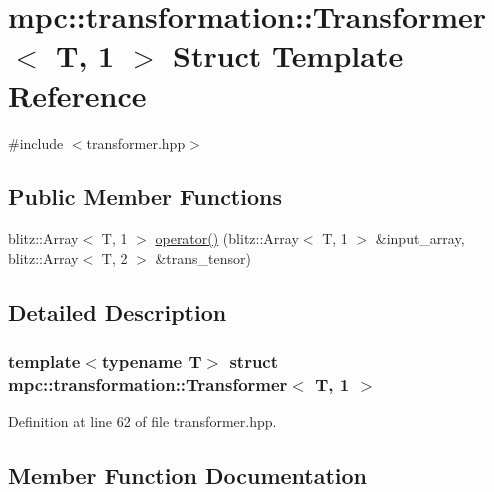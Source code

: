 \hypertarget{structmpc_1_1transformation_1_1_transformer_3_01_t_00_011_01_4}{}\section{mpc\+:\+:transformation\+:\+:Transformer$<$ T, 1 $>$ Struct Template Reference}
\label{structmpc_1_1transformation_1_1_transformer_3_01_t_00_011_01_4}


{\ttfamily \#include $<$transformer.\+hpp$>$}

\subsection*{Public Member Functions}
\begin{DoxyCompactItemize}
\item 
blitz\+::\+Array$<$ T, 1 $>$ \mbox{\hyperlink{structmpc_1_1transformation_1_1_transformer_3_01_t_00_011_01_4_aeb2bd7dbf3f77b736f7dc58cb39e0b41}{operator()}} (blitz\+::\+Array$<$ T, 1 $>$ \&input\+\_\+array, blitz\+::\+Array$<$ T, 2 $>$ \&trans\+\_\+tensor)
\end{DoxyCompactItemize}


\subsection{Detailed Description}
\subsubsection*{template$<$typename T$>$\newline
struct mpc\+::transformation\+::\+Transformer$<$ T, 1 $>$}



Definition at line 62 of file transformer.\+hpp.



\subsection{Member Function Documentation}
\mbox{\label{structmpc_1_1transformation_1_1_transformer_3_01_t_00_011_01_4_aeb2bd7dbf3f77b736f7dc58cb39e0b41}} 
